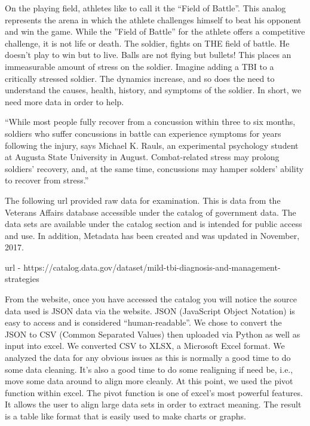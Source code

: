 \documentclass[sigconf]{acmart}
\begin{document}
On the playing field, athletes like to call it the ``Field of Battle''.  This analog represents the arena in which the athlete challenges himself to beat his opponent and win the game.  While the ''Field of Battle'' for the athlete offers a competitive challenge, it is not life or death.  The soldier, fights on THE field of battle.  He doesn't play to win but to live.  Balls are not flying but bullets!  This places an immeasurable amount of stress on the soldier.  Imagine adding a TBI to a critically stressed soldier.  The dynamics increase, and so does the need to understand the causes, health, history, and symptoms of the soldier.  In short, we need more data in order to help.

``While most people fully recover from a concussion within three to six months, soldiers who suffer concussions in battle can experience symptoms for years following the injury, says Michael K. Rauls, an experimental psychology student at Augusta State University in August.  Combat-related stress may prolong soldiers' recovery, and, at the same time, concussions may hamper solders' ability to recover from stress.''\cite{www-apa-org}

The following url provided raw data for examination.  This is data from the Veterans Affairs database accessible under the catalog of government data.  The data sets are available under the catalog section and is intended for public access and use.  In addition, Metadata has been created and was updated in November, 2017.  

url - https://catalog.data.gov/dataset/mild-tbi-diagnosis-and-management-strategies 
\cite{www-catalog-data-gov}

From the website, once you have accessed the catalog you will notice the source data used is JSON data via the website.  JSON (JavaScript Object Notation) is easy to access and is considered ``human-readable''.  We chose to convert the JSON to CSV (Common Separated Values) then uploaded via Python as well as input into excel. We converted CSV to XLSX, a Microsoft Excel format.  We analyzed the data for any obvious issues as this is normally a good time to do some data cleaning.  It's also a good time to do some realigning if need be, i.e., move some data around to align more cleanly.  At this point, we used the pivot function within excel.  The pivot function is one of excel's most powerful features.  It allows the user to align large data sets in order to extract meaning.  The result is a table like format that is easily used to make charts or graphs. 
\end{document}
